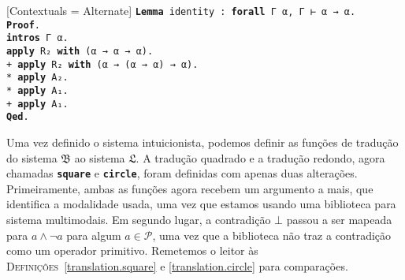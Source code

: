 \vspace{0.5\baselineskip}
\begin{tcolorbox}[enhanced jigsaw, breakable, sharp corners, colframe=black, colback=white, boxrule=0.5pt, left=1.5mm, right=1.5mm, top=1.5mm, bottom=1.5mm]
\setmonofont{Fira Code}[Contextuals = Alternate]
\noindent
\texttt
{\noindent\footnotesize\textbf{Lemma} identity : \textbf{forall} Γ α, Γ ⊢ α → α.\\
\textbf{Proof}.\\
\phantom{\ \ \ \ }\textbf{intros} Γ α.\\
\phantom{\ \ \ \ }\textbf{apply} R₂ \textbf{with} (α → α → α).\\
\phantom{\ \ \ \ }+ \textbf{apply} R₂ \textbf{with} (α → (α → α) → α).\\
\phantom{\ \ \ \ }\phantom{\ \ \ \ }* \textbf{apply} A₂.\\
\phantom{\ \ \ \ }\phantom{\ \ \ \ }* \textbf{apply} A₁.\\
\phantom{\ \ \ \ }+ \textbf{apply} A₁.\\
\textbf{Qed}.
}
\end{tcolorbox}

\vspace{0.5\baselineskip}
Uma vez definido o sistema intuicionista, podemos definir as funções de tradução do sistema $\mathfrak{B}$ ao sistema $\mathfrak{L}$.
A tradução quadrado e a tradução redondo, agora chamadas \texttt{\textbf{square}} e \texttt{\textbf{circle}}, foram definidas com apenas duas alterações.
Primeiramente, ambas as funções agora recebem um argumento a mais, que identifica a modalidade usada, uma vez que estamos usando uma biblioteca para sistema multimodais.
Em segundo lugar, a contradição $\bot$ passou a ser mapeada para $a\wedge\neg a$ para algum $a\in\mathcal{P}$, uma vez que a biblioteca não traz a contradição como um operador primitivo.
Remetemos o leitor às \textsc{Definições}~\ref{translation.square} e \ref{translation.circle} para comparações.

